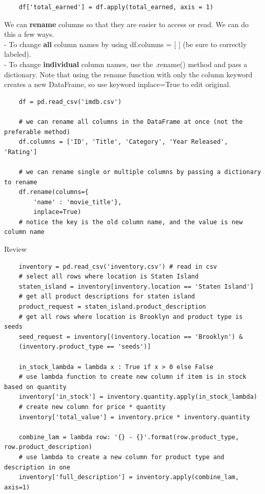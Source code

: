 \documentclass[11pt, a4paper]{article}
\begin{document}
\begin{spacing}{1.1}
\begin{lstlisting}
	df['total_earned'] = df.apply(total_earned, axis = 1) \end{lstlisting} \newpage
	\noindent We can \textbf{rename} columns so that they are easier to access or read. We can do this a few ways. \\
	\hspace*{4mm} - To change \textbf{all} column names by using df.columns = [ ] (be sure to correctly labeled). \\
	\hspace*{4mm} - To change \textbf{individual} column names, use the .rename() method and pass a dictionary. Note that \hspace*{7mm} using the rename function with only the column keyword creates a new DataFrame, so use keyword \hspace*{7mm} inplace=True to edit original.
	\begin{lstlisting}
	df = pd.read_csv('imdb.csv')
	
	# we can rename all columns in the DataFrame at once (not the preferable method)
	df.columns = ['ID', 'Title', 'Category', 'Year Released', 'Rating']
	
	# we can rename single or multiple columns by passing a dictionary to rename
	df.rename(columns={
		'name' : 'movie_title'},
		inplace=True)
	# notice the key is the old column name, and the value is new column name \end{lstlisting}\vspace*{1mm}
	Review
	\begin{lstlisting}
	inventory = pd.read_csv('inventory.csv') # read in csv
	# select all rows where location is Staten Island
	staten_island = inventory[inventory.location == 'Staten Island']
	# get all product descriptions for staten island
	product_request = staten_island.product_description 
	# get all rows where location is Brooklyn and product type is seeds
	seed_request = inventory[(inventory.location == 'Brooklyn') & 
	(inventory.product_type == 'seeds')]
	
	in_stock_lambda = lambda x : True if x > 0 else False 
	# use lambda function to create new column if item is in stock based on quantity
	inventory['in_stock'] = inventory.quantity.apply(in_stock_lambda)
	# create new column for price * quantity
	inventory['total_value'] = inventory.price * inventory.quantity 
	
	combine_lam = lambda row: '{} - {}'.format(row.product_type, row.product_description)
	# use lambda to create a new column for product type and description in one
	inventory['full_description'] = inventory.apply(combine_lam, axis=1) \end{lstlisting} \vspace*{3mm}
	

\end{spacing}
\end{document}
